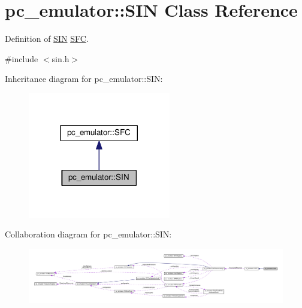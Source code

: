 \hypertarget{classpc__emulator_1_1SIN}{}\section{pc\+\_\+emulator\+:\+:S\+IN Class Reference}
\label{classpc__emulator_1_1SIN}


Definition of \hyperlink{classpc__emulator_1_1SIN}{S\+IN} \hyperlink{classpc__emulator_1_1SFC}{S\+FC}.  




{\ttfamily \#include $<$sin.\+h$>$}



Inheritance diagram for pc\+\_\+emulator\+:\+:S\+IN\+:
\nopagebreak
\begin{figure}[H]
\begin{center}
\leavevmode
\includegraphics[width=176pt]{classpc__emulator_1_1SIN__inherit__graph}
\end{center}
\end{figure}


Collaboration diagram for pc\+\_\+emulator\+:\+:S\+IN\+:
\nopagebreak
\begin{figure}[H]
\begin{center}
\leavevmode
\includegraphics[width=350pt]{classpc__emulator_1_1SIN__coll__graph}
\end{center}
\end{figure}
